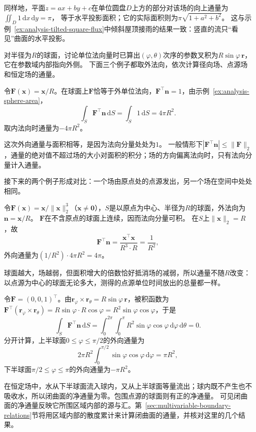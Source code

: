 同样地，平面$z=ax+by+c$在单位圆盘$D$上方的部分对该场的向上通量为$\iint_D1\,\mathrm dx\,\mathrm dy=\pi$，
等于水平投影面积；它的实际面积则为$\pi\sqrt{1+a^2+b^2}$。
这与示例~\ref{ex:analysis-tilted-square-flux}中倾斜屋顶接雨的结果一致：竖直的流只“看见”曲面的水平投影。

对半径为$R$的球面，讨论单位法向量时已算出$(\varphi,\theta)$次序的参数叉积为$R\sin\varphi\,\bm r$，它在参数域内部指向外侧。
下面三个例子都取外法向，依次计算径向场、点源场和恒定场的通量。

\begin{example}[径向场穿过球面]
\label{ex:analysis-radial-field-sphere-flux}
令$\bm F(\bm x)=\bm x/R$。在球面上$\bm F$恰等于外单位法向，$\bm F^\top\bm n=1$，由示例~\ref{ex:analysis-sphere-area}，
\[
 \int_S\bm F^\top\bm n\,\mathrm dS
 =\int_S1\,\mathrm dS=4\pi R^2.
\]
取内法向时通量为$-4\pi R^2$。
\end{example}

这次外向通量与面积相等，是因为法向分量处处为$1$。
一般情形下$|\bm F^\top\bm n|\leq\lVert\bm F\rVert_2$，通量的绝对值不超过场的大小对面积的积分；场的方向偏离法向时，只有法向分量计入通量。

接下来的两个例子形成对比：一个场由原点处的点源发出，另一个场在空间中处处相同。

\begin{example}[点源场的通量与半径无关]
\label{ex:analysis-point-source-sphere-flux}
令$\bm F(\bm x)=\bm x/\lVert\bm x\rVert_2^3$（$\bm x\neq\bm0$），$S$是以原点为中心、半径为$R$的球面，外法向为$\bm n=\bm x/R$。
$\bm F$在不含原点的球面上连续，因而法向分量可积。
在$S$上$\lVert\bm x\rVert_2=R$，故
\[
 \bm F^\top\bm n=\frac{\bm x^\top\bm x}{R^3\cdot R}=\frac1{R^2},
\]
外向通量为$(1/R^2)\cdot4\pi R^2=4\pi$。
\end{example}

球面越大，场越弱，但面积增大的倍数恰好抵消场的减弱，所以通量不随$R$改变：
以点源为中心的球面无论多大，测得的点源单位时间放出的总量都一样。

\begin{example}[恒定场穿过球面的净通量为零]
\label{ex:analysis-constant-field-sphere-flux}
令$\bm F=(0,0,1)^\top$。由$\bm r_\varphi\times\bm r_\theta=R\sin\varphi\,\bm r$，被积函数为
$\bm F^\top(\bm r_\varphi\times\bm r_\theta)=R\sin\varphi\cdot R\cos\varphi=R^2\sin\varphi\cos\varphi$，于是
\[
 \int_S\bm F^\top\bm n\,\mathrm dS
 =\int_0^{2\pi}\int_0^\pi R^2\sin\varphi\cos\varphi\,\mathrm d\varphi\,\mathrm d\theta=0.
\]
分开计算，上半球面$0\leq\varphi\leq\pi/2$的外向通量为
\[
 2\pi R^2\int_0^{\pi/2}\sin\varphi\cos\varphi\,\mathrm d\varphi=\pi R^2,
\]
下半球面$\pi/2\leq\varphi\leq\pi$的外向通量为$-\pi R^2$。
\end{example}

在恒定场中，水从下半球面流入球内，又从上半球面等量流出；球内既不产生也不吸收水，所以闭曲面的净通量为零。包围点源的球面则有正的净通量。
可见闭曲面的净通量反映它所围区域内部的源与汇。第~\ref{sec:multivariable-boundary-relations}节将用区域内部的散度累计来计算闭曲面的通量，并核对这里的几个结果。

\FloatBarrier
